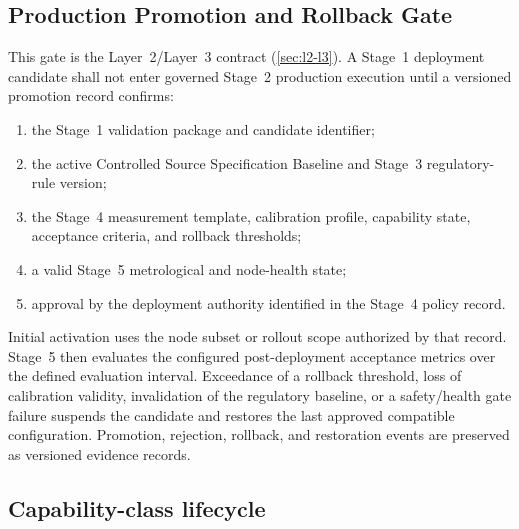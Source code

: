 \documentclass[11pt,a4paper]{article}
\begin{document}
\subsection{Production Promotion and Rollback Gate}
\label{sec:promotion}

This gate is the Layer~2/Layer~3 contract (\cref{sec:l2-l3}). A Stage~1 deployment candidate
shall not enter governed Stage~2 production execution until a versioned promotion record
confirms:

\begin{enumerate}[label=(\roman*)]
  \item the Stage~1 validation package and candidate identifier;
  \item the active Controlled Source Specification Baseline and Stage~3 regulatory-rule version;
  \item the Stage~4 measurement template, calibration profile, capability state, acceptance
    criteria, and rollback thresholds;
  \item a valid Stage~5 metrological and node-health state;
  \item approval by the deployment authority identified in the Stage~4 policy record.
\end{enumerate}

Initial activation uses the node subset or rollout scope authorized by that record. Stage~5 then
evaluates the configured post-deployment acceptance metrics over the defined evaluation interval.
Exceedance of a rollback threshold, loss of calibration validity, invalidation of the regulatory
baseline, or a safety/health gate failure suspends the candidate and restores the last approved
compatible configuration. Promotion, rejection, rollback, and restoration events are preserved as
versioned evidence records.

\subsection{Capability-class lifecycle}
\label{sec:capability}
\end{document}
